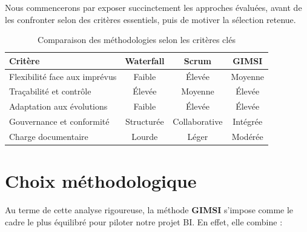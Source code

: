 \documentclass[a4paper,11pt]{report}
\begin{document}
Nous commencerons par exposer succinctement les approches évaluées, avant de les confronter selon des critères essentiels, puis de motiver la sélection retenue.

\vspace{1em}
\begin{table}[h!]
  \centering
  \begin{tabular}{@{}lccc@{}}
    \toprule
    \rowcolor{blue!30} \textbf{Critère} & \textbf{Waterfall} & \textbf{Scrum} & \textbf{GIMSI} \\
    \midrule
    Flexibilité face aux imprévus    & Faible   & Élevée   & Moyenne \\
    Traçabilité et contrôle          & Élevée   & Moyenne  & Élevée  \\
    Adaptation aux évolutions        & Faible   & Élevée   & Élevée  \\
    Gouvernance et conformité        & Structurée & Collaborative & Intégrée \\
    Charge documentaire              & Lourde   & Léger    & Modérée \\
    \bottomrule
  \end{tabular}
  \caption{Comparaison des méthodologies selon les critères clés}
  \label{tab:comparaison-methodos}
\end{table}

\section{Choix méthodologique}
Au terme de cette analyse rigoureuse, la méthode \textbf{GIMSI} s’impose comme le cadre le plus équilibré pour piloter notre projet BI. En effet, elle combine :
\end{document}
